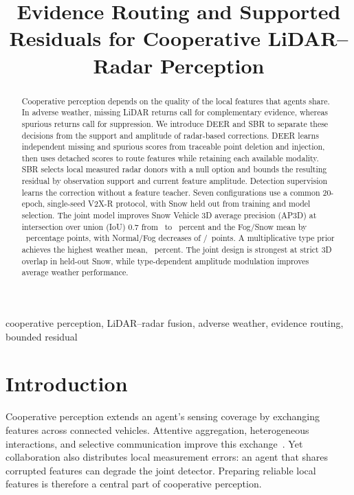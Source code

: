 \documentclass[conference]{IEEEtran}
\begin{document}
\title{Evidence Routing and Supported Residuals for Cooperative LiDAR--Radar Perception}
\author{}
\maketitle

\begin{abstract}
Cooperative perception depends on the quality of the local features that agents share. In adverse weather, missing LiDAR returns call for complementary evidence, whereas spurious returns call for suppression. We introduce DEER and SBR to separate these decisions from the support and amplitude of radar-based corrections. DEER learns independent missing and spurious scores from traceable point deletion and injection, then uses detached scores to route features while retaining each available modality. SBR selects local measured radar donors with a null option and bounds the resulting residual by observation support and current feature amplitude. Detection supervision learns the correction without a feature teacher. Seven configurations use a common 20-epoch, single-seed V2X-R protocol, with Snow held out from training and model selection. The joint model improves Snow Vehicle 3D average precision (AP3D) at intersection over union (IoU) 0.7 from \BaseSnow\ to \ABSsnow\ percent and the Fog/Snow mean by \ABMeanGain\ percentage points, with Normal/Fog decreases of \ABNormalLoss/\ABFogLoss\ points. A multiplicative type prior achieves the highest weather mean, \PriorMean\ percent. The joint design is strongest at strict 3D overlap in held-out Snow, while type-dependent amplitude modulation improves average weather performance.
\end{abstract}

\begin{IEEEkeywords}
cooperative perception, LiDAR--radar fusion, adverse weather, evidence routing, bounded residual
\end{IEEEkeywords}

\section{Introduction}
Cooperative perception extends an agent's sensing coverage by exchanging features across connected vehicles. Attentive aggregation, heterogeneous interactions, and selective communication improve this exchange~\cite{opv2v,v2xvit,where2comm}. Yet collaboration also distributes local measurement errors: an agent that shares corrupted features can degrade the joint detector. Preparing reliable local features is therefore a central part of cooperative perception.
\end{document}
